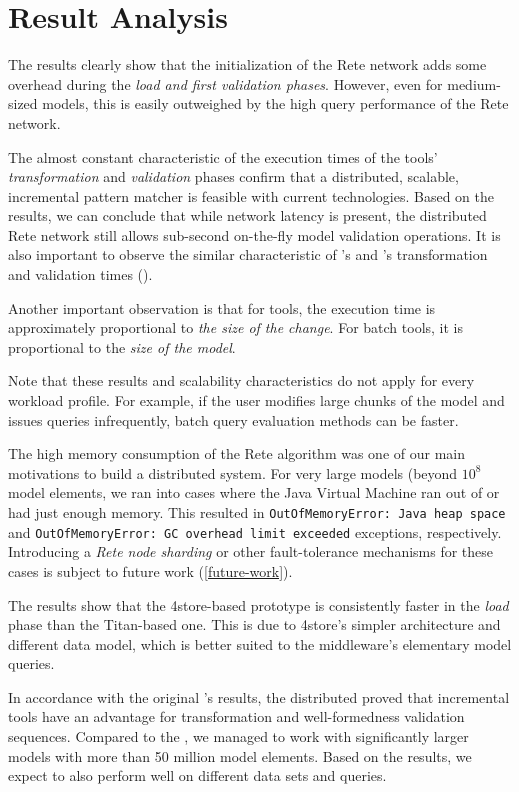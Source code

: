\section{Result Analysis}

The results clearly show that the initialization of the Rete network adds some overhead during the \emph{load and first validation phases}. However, even for medium-sized models, this is easily outweighed by the high query performance of the Rete network.

The almost constant characteristic of the execution times of the \iqd{} tools' \emph{transformation} and \emph{validation} phases confirm that a distributed, scalable, incremental pattern matcher is feasible with current technologies. Based on the results, we can conclude that while network latency is present, the distributed Rete network still allows sub-second on-the-fly model validation operations. It is also important to observe the similar characteristic of \iqd{}'s and \eiq{}'s transformation and validation times ().

Another important observation is that for \iqd{} tools, the execution time is approximately proportional to \emph{the size of the change}. For batch tools, it is proportional to the \emph{size of the model}. 

Note that these results and scalability characteristics do not apply for every workload profile. For example, if the user modifies large chunks of the model and issues queries infrequently, batch query evaluation methods can be faster. 

The high memory consumption of the Rete algorithm was one of our main motivations to build a distributed system. For very large models (beyond $10^8$ model elements, we ran into cases where the Java Virtual Machine ran out of or had just enough memory. This resulted in \texttt{OutOfMemoryError: Java heap space} and \texttt{OutOfMemoryError: GC overhead limit exceeded} exceptions, respectively. Introducing a \emph{Rete node sharding} or other fault-tolerance mechanisms for these cases is subject to future work (\autoref{future-work}).

The results show that the 4store-based \iqd{} prototype is consistently faster in the \emph{load} phase than the Titan-based one. This is due to 4store's simpler architecture and different data model, which is better suited to the \iqd{} middleware's elementary model queries.

In accordance with the original \tb{}'s results, the distributed \tb{} proved that incremental tools have an advantage for transformation and well-formedness validation sequences. Compared to the \tb{}, we managed to work with significantly larger models with more than 50 million model elements. Based on the results, we expect \iqd{} to also perform well on different data sets and queries.  

